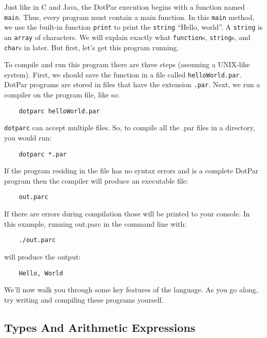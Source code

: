 \documentclass{article}
\begin{document}
Just like in C and Java, the DotPar execution begins with a function named \verb=main=. Thus, every program must contain a main function. In this \verb=main= method, we use the built-in function \verb=print= to print the \verb=string= ``Hello, world''. A \verb=string= is an \verb=array= of characters. We will explain exactly what \verb=function=s, \verb=string=s, and \verb=char=s in later. But first, let's get this program running.

To compile and run this program there are three steps (assuming a UNIX-like system). First, we should save the function in a file called \verb=helloWorld.par=. DotPar programs are stored in files that have the extension \verb=.par=. Next, we run a compiler on the program file, like so:

\begin{verbatim}
    dotparc helloWorld.par
\end{verbatim}

\verb=dotparc= can accept multiple files. So, to compile all the .par files in a directory, you would run: 

\begin{verbatim}
    dotparc *.par
\end{verbatim}

If the program residing in the file has no syntax errors and is a complete DotPar program then the compiler will produce an executable file:

\begin{verbatim}
    out.parc
\end{verbatim}

If there are errors during compilation those will be printed to your console. In this example, running out.parc in the command line with:

\begin{verbatim}
    ./out.parc
\end{verbatim}

will produce the output:

\begin{verbatim}
    Hello, World
\end{verbatim}

We'll now walk you through some key features of the language. As you go along, try writing and compiling these programs yourself.

\subsection{Types And Arithmetic Expressions}
\end{document}
